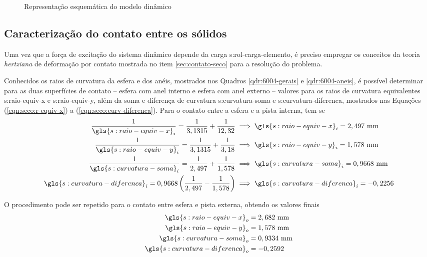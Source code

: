 \documentclass[12pt,oneside,english,brazil,lmodern,siglas,simbolos,cite=num]{ucsmonograph}
\begin{document}
	\begin{figure}[t]
		\caption{Representação esquemática do modelo dinâmico}
		\label{fig:modelo-dinamico}
	\end{figure}
	
	\subsection{Caracterização do contato entre os sólidos}
	Uma vez que a força de excitação do sistema dinâmico depende da carga \gls{s:rol-carga-elemento}, é preciso empregar os conceitos da teoria \emph{hertziana} de deformação por contato mostrada no item \ref{sec:contato-seco} para a resolução do problema.
	
	Conhecidos os raios de curvatura da esfera e dos anéis, mostrados nos Quadros \ref{qdr:6004-gerais} e \ref{qdr:6004-aneis}, é possível determinar para as duas superfícies de contato -- esfera com anel interno e esfera com anel externo -- valores para os raios de curvatura equivalentes \gls{s:raio-equiv-x} e \gls{s:raio-equiv-y}, além da soma e diferença de curvatura \gls{s:curvatura-soma} e \gls{s:curvatura-diferenca}, mostrados nas Equações (\ref{eqn:seco:r-equiv-x}) a (\ref{eqn:seco:curv-diferenca}).
	Para o contato entre a esfera e a pista interna, tem-se
	\begin{align*}
		\frac{1}{\gls{s:raio-equiv-x}_i} = \frac{1}{3,1315} +
		\frac{1}{12,32} &\implies \gls{s:raio-equiv-x}_i =
		2,497\ \text{mm} \\
		\frac{1}{\gls{s:raio-equiv-y}_i} = \frac{1}{3,1315} +
		\frac{1}{3,18} &\implies \gls{s:raio-equiv-y}_i =
		1,578\ \text{mm} \\
		\frac{1}{\gls{s:curvatura-soma}_i} = \frac{1}{2,497} +
		\frac{1}{1,578} &\implies \gls{s:curvatura-soma}_i =
		0,9668\ \text{mm}\\
		\gls{s:curvatura-diferenca}_i = 0,9668\left( 
		\frac{1}{2,497} - \frac{1}{1,578} \right) &\implies
		\gls{s:curvatura-diferenca}_i = -0,2256 
	\end{align*}
	
	O procedimento pode ser repetido para o contato entre esfera e pista externa, obtendo os valores finais
	\begin{align*}
		\gls{s:raio-equiv-x}_o &= 2,682\ \text{mm}\\
		\gls{s:raio-equiv-y}_o &= 1,578\ \text{mm}\\
		\gls{s:curvatura-soma}_o &= 0,9334\ \text{mm}\\
		\gls{s:curvatura-diferenca}_o &= -0,2592
	\end{align*}
	
\end{document}
